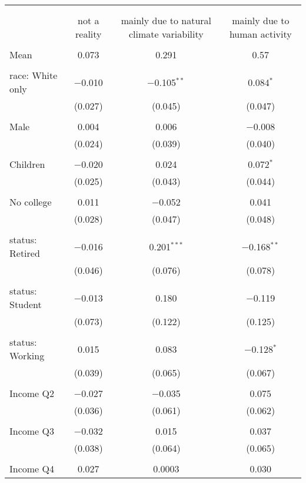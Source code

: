 
\begin{tabular}{@{\extracolsep{5pt}}lccc} 
\\[-1.8ex]\hline 
\hline \\[-1.8ex] 
\\[-1.8ex] & not a reality & mainly due to natural climate variability & mainly due to human activity \\ 
\hline \\[-1.8ex] 
 Mean & 0.073 & 0.291 & 0.57  \\ \hline \\[-1.8ex] race: White only & $-$0.010 & $-$0.105$^{**}$ & 0.084$^{*}$ \\ 
  & (0.027) & (0.045) & (0.047) \\ 
  & & & \\ 
 Male & 0.004 & 0.006 & $-$0.008 \\ 
  & (0.024) & (0.039) & (0.040) \\ 
  & & & \\ 
 Children & $-$0.020 & 0.024 & 0.072$^{*}$ \\ 
  & (0.025) & (0.043) & (0.044) \\ 
  & & & \\ 
 No college & 0.011 & $-$0.052 & 0.041 \\ 
  & (0.028) & (0.047) & (0.048) \\ 
  & & & \\ 
 status: Retired & $-$0.016 & 0.201$^{***}$ & $-$0.168$^{**}$ \\ 
  & (0.046) & (0.076) & (0.078) \\ 
  & & & \\ 
 status: Student & $-$0.013 & 0.180 & $-$0.119 \\ 
  & (0.073) & (0.122) & (0.125) \\ 
  & & & \\ 
 status: Working & 0.015 & 0.083 & $-$0.128$^{*}$ \\ 
  & (0.039) & (0.065) & (0.067) \\ 
  & & & \\ 
 Income Q2 & $-$0.027 & $-$0.035 & 0.075 \\ 
  & (0.036) & (0.061) & (0.062) \\ 
  & & & \\ 
 Income Q3 & $-$0.032 & 0.015 & 0.037 \\ 
  & (0.038) & (0.064) & (0.065) \\ 
  & & & \\ 
 Income Q4 & 0.027 & 0.0003 & 0.030 \\ 

\end{tabular}
